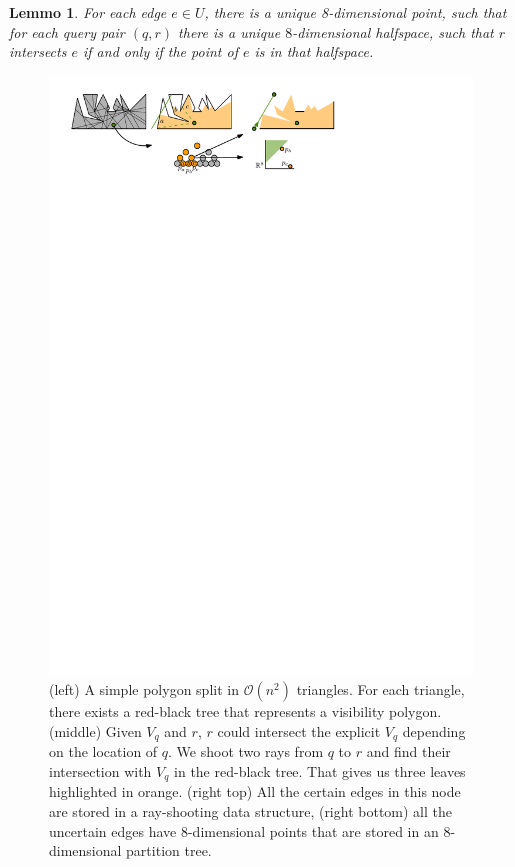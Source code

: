 \documentclass[a4paper, UKenglish]{paper}
\newtheorem{lemma}{Lemmo}
\begin{document}
\begin{lemma}
\label{lemma:uncertain_intersection}
For each edge $e \in U$, there is a unique 8-dimensional point, such that for each query pair $(q, r)$ there is a unique $8$-dimensional halfspace, such that $r$ intersects $e$ if and only if the point of $e$ is in that halfspace.
\end{lemma}



\begin{figure}[h]
    \centering
    \includegraphics[]{../twolevel}
    \caption{ (left) A simple polygon split in $\mathcal{O}(n^2)$ triangles. For each triangle, there exists a red-black tree that represents a visibility polygon. (middle) Given $V_q$ and $r$, $r$ could intersect the explicit $V_q$ depending on the location of $q$. We shoot two rays from $q$ to $r$ and find their intersection with $V_q$ in the red-black tree. That gives us three leaves highlighted in orange. (right top) All the certain edges in this node are stored in a ray-shooting data structure, (right bottom) all the uncertain edges have 8-dimensional points that are stored in an $8$-dimensional partition tree.}
    \label{fig:twolevel}
\end{figure}
\end{document}
